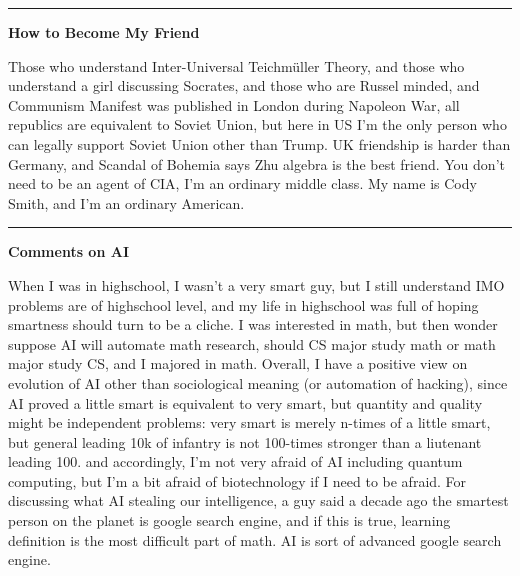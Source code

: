 \documentclass{article}
\begin{document}
\noindent\rule{\textwidth}{0.4pt}

\noindent
\textbf{How to Become My Friend}

\noindent
Those who understand Inter-Universal Teichm\"uller Theory, and those who understand a girl discussing Socrates, 
and those who are Russel minded, and Communism Manifest was published in London during Napoleon War,
all republics are equivalent to Soviet Union, but here in US I'm the only person who can legally support Soviet Union other than Trump.
UK friendship is harder than Germany, and Scandal of Bohemia says Zhu algebra is the best friend.
You don't need to be an agent of CIA, I'm an ordinary middle class. My name is Cody Smith, and I'm an ordinary American. \\





\noindent\rule{\textwidth}{0.4pt}

\noindent
\textbf{Comments on AI}

\noindent
When I was in highschool, I wasn't a very smart guy, but I still understand IMO problems are of highschool level,
and my life in highschool was full of hoping smartness should turn to be a cliche.
I was interested in math, but then wonder suppose AI will automate math research, 
should CS major study math or math major study CS, and I majored in math.
Overall, I have a positive view on evolution of AI other than sociological meaning (or automation of hacking),
since AI proved a little smart is equivalent to very smart, but quantity and quality might be independent problems: 
very smart is merely n-times of a little smart, but general leading 10k of infantry is not 100-times stronger than a liutenant leading 100.
and accordingly, I'm not very afraid of AI including quantum computing, but I'm a bit afraid of biotechnology if I need to be afraid.
For discussing what AI stealing our intelligence, a guy said a decade ago the smartest person on the planet is google search engine, 
and if this is true, learning definition is the most difficult part of math. AI is sort of advanced google search engine. \\
\end{document}
